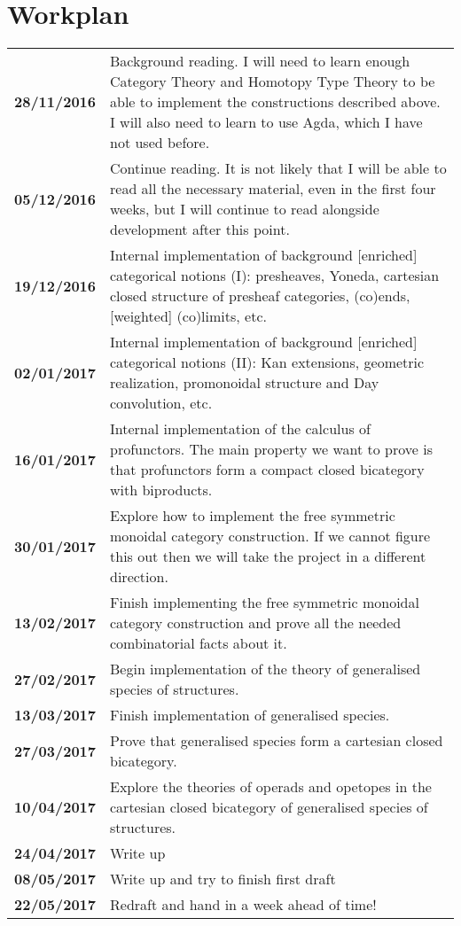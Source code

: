 \documentclass[12pt, parskip]{scrartcl}
\begin{document}
\newpage

\section{Workplan}

\begin{table}[h]
  \def\arraystretch{1.5}
  \begin{tabular}{rp{13.6cm}}
    \textbf{28/11/2016} & Background reading. I will need to learn enough Category Theory and Homotopy Type Theory to be able to implement the constructions described above. I will also need to learn to use Agda, which I have not used before. \\
    \textbf{05/12/2016} & Continue reading. It is not likely that I will be able to read all the necessary material, even in the first four weeks, but I will continue to read alongside development after this point. \\
    \textbf{19/12/2016} & Internal implementation of background [enriched] categorical notions (I): presheaves, Yoneda, cartesian closed structure of presheaf categories, (co)ends, [weighted] (co)limits, etc. \\
    \textbf{02/01/2017} & Internal implementation of background [enriched] categorical notions (II): Kan extensions, geometric realization, promonoidal structure and Day convolution, etc. \\
    \textbf{16/01/2017} & Internal implementation of the calculus of profunctors.  The main property we want to prove is that profunctors form a compact closed bicategory with biproducts. \\
    \textbf{30/01/2017} & Explore how to implement the free symmetric monoidal category construction. If we cannot figure this out then we will take the project in a different direction. \\
    \textbf{13/02/2017} & Finish implementing the free symmetric monoidal category construction and prove all the needed combinatorial facts about it.  \\
    \textbf{27/02/2017} & Begin implementation of the theory of generalised species of structures. \\
    \textbf{13/03/2017} & Finish implementation of generalised species. \\
    \textbf{27/03/2017} & Prove that generalised species form a cartesian closed bicategory. \\
    \textbf{10/04/2017} & Explore the theories of operads and opetopes in the cartesian closed bicategory of generalised species of structures. \\
    \textbf{24/04/2017} & Write up \\
    \textbf{08/05/2017} & Write up and try to finish first draft \\
    \textbf{22/05/2017} & Redraft and hand in a week ahead of time! \\
  \end{tabular}
\end{table}
\end{document}
